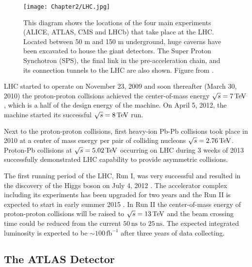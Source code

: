 \begin{figure}[t]
  \centering
  \texttt{[image: Chapter2/LHC.jpg]}
  \caption[This diagram shows the locations of the four main experiments (ALICE,
          ATLAS, CMS and LHCb) that take place at the LHC. Located between 50 m and
          150 m underground, huge caverns have been excavated to house the giant
          detectors. The Super Proton Synchotron (SPS), the final link in the
          pre-acceleration chain, and its connection tunnels to the LHC are also
          shown.]
          {This diagram shows the locations of the four main experiments (ALICE,
          ATLAS, CMS and LHCb) that take place at the LHC. Located between 50 m and
          150 m underground, huge caverns have been excavated to house the giant
          detectors. The Super Proton Synchotron (SPS), the final link in the
          pre-acceleration chain, and its connection tunnels to the LHC are also
          shown.  Figure from \cite{CERN:ATLASexperimentPictureswiki}.  }
  \label{fig:LHC}
\end{figure}

LHC started to operate on November 23, 2009 and soon thereafter (March 30, 2010)
the proton-proton collisions achieved the center-of-mass energy $\sqrt{s} = 7
\,\text{TeV}$, which is a half of the design energy of the machine. On April 5, 2012, the
machine started its successful $\sqrt{s} = 8 \,\text{TeV}$ run.

Next to the proton-proton collisions, first heavy-ion Pb-Pb collisions took place
in 2010 at a center of mass energy per pair of colliding nucleons $\sqrt{s} =
2.76 \,\text{TeV}$. Proton-Pb collisions at $\sqrt{s} = 5.02 \,\text{TeV}$ occurring on LHC
during 3 weeks of 2013 successfully demonstrated LHC capability to provide
asymmetric collisions.  

The first running period of the LHC, Run I, was very successful and resulted in
the discovery of the Higgs boson on July 4, 2012 \cite{HiggsDiscovery}.  The
accelerator complex including its experiments has been upgraded for two years
and the Run II is expected to start in early summer 2015 \cite{LHCFuture,
LHCFutureLuminosigy}. In Run II the center-of-mass energy of proton-proton
collisions will be raised to $\sqrt{s} = 13 \,\text{TeV}$ and the beam crossing time
could be reduced from the current $50\,\text{ns}$ to $25\,\text{ns}$. The
expected integrated luminosity is expected to be $\sim 100\,\text{fb}^{-1}$
after three years of data collecting.

\subsection{The ATLAS Detector}

